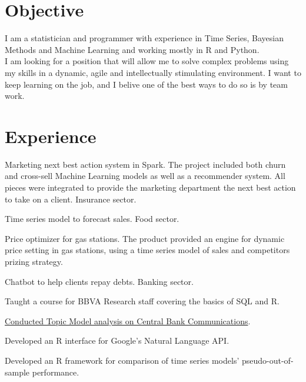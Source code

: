 \documentclass[]{deedy-resume-openfont}
\begin{document}
\begin{minipage}[t]{0.66\textwidth} 


\section{Objective}
I am a statistician and programmer with experience in Time Series, Bayesian Methods and Machine Learning and working
mostly in R and Python.\\
I am looking for a position that will allow me to solve complex problems using my skills in a dynamic, agile and 
intellectually stimulating environment. I want to keep learning on the job, and I belive one of the best ways
to do so is by team work.  
\sectionsep


\section{Experience}

\vspace{\topsep} %
\begin{tightemize}
\item Marketing next best action system in Spark. The project included both churn and cross-sell Machine Learning
models as well as a recommender system. All pieces were integrated to provide the marketing department the next
best action to take on a client.
Insurance sector.
\item Time series model to forecast sales. Food sector.
\item Price optimizer for gas stations. The product provided an engine for dynamic price setting in gas stations,
using a time series model of sales and competitors prizing strategy.
\item Chatbot to help clients repay debts. Banking sector.
\end{tightemize}
\sectionsep

\begin{tightemize}
\item Taught a course for BBVA Research staff covering the basics of SQL and R.
\item \href{
https://www.bbvaresearch.com/en/publicaciones/how-do-the-emerging-markets-central-bank-talk-a-big-data-approach-to-the-cb-of-turkey/
}
  {Conducted Topic Model analysis on Central Bank Communications}. 
\item Developed an R interface for Google's Natural Language API.
\item Developed an R framework for comparison of time series models' 
  pseudo-out-of-sample performance.
\end{tightemize}
\sectionsep


\end{minipage}
\end{document}
